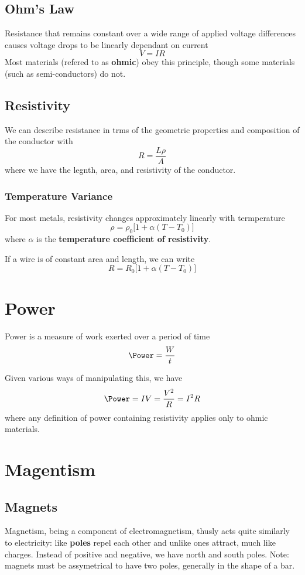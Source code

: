 \documentclass[12pt]{article}
\begin{document}
\subsection*{Ohm's Law}
Resistance that remains constant over a wide range of applied voltage differences causes voltage drops to be linearly dependant on current \[ V = IR \] Most materials (refered to as {\bf ohmic}) obey this principle, though some materials (such as semi-conductors) do not.

\subsection*{Resistivity}
We can describe resistance in trms of the geometric properties and composition of the conductor with \[ R = \frac{L \rho}{A} \] where we have the legnth, area, and resistivity of the conductor.

\subsubsection*{Temperature Variance}
For most metals, resistivity changes approximately linearly with termperature \[ \rho = \rho_0 \bigl[ 1 + \alpha(T - T_0) \bigl] \] where $\alpha$ is the {\bf temperature coefficient of resistivity}.

If a wire is of constant area and length, we can write \[ R = R_0 \bigl[ 1 + \alpha (T - T_0) \bigl] \]

\section*{Power}
Power is a measure of work exerted over a period of time \[ \Power = \frac{W}{t} \]

Given various ways of manipulating this, we have \[ \Power = IV = \frac{V^2}{R} = I^2R \] where any definition of power containing resistivity applies only to ohmic materials.

\section*{Magentism}
\subsection*{Magnets}
Magnetism, being a component of electromagnetism, thusly acts quite similarly to electricity: like {\bf poles} repel each other and unlike ones attract, much like charges. Instead of positive and negative, we have north and south poles. Note: magnets must be assymetrical to have two poles, generally in the shape of a bar.
\end{document}

